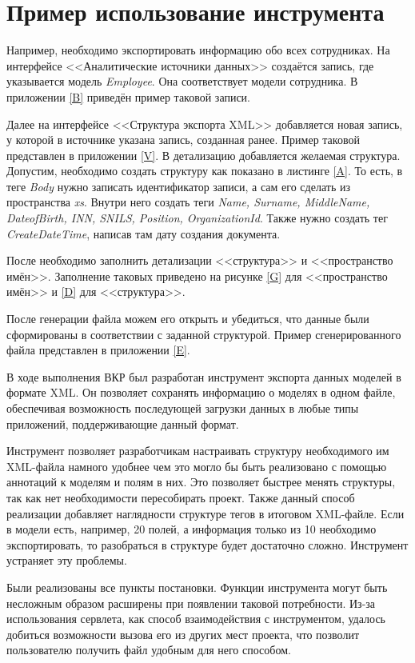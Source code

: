 \documentclass[a4paper,12pt]{diplom}
\begin{document}
\section{Пример использование инструмента}

Например, необходимо экспортировать информацию обо всех сотрудниках. На интерфейсе <<Аналитические источники данных>> создаётся запись, где указывается модель \textit{Employee}. Она соответствует модели сотрудника. В приложении \ref{B} приведён пример таковой записи.

Далее на интерфейсе <<Структура экспорта XML>> добавляется новая запись, у которой в источнике указана запись, созданная ранее. Пример таковой представлен в приложении \ref{V}. В детализацию добавляется желаемая структура. Допустим, необходимо создать структуру как показано в листинге \ref{A}. То есть, в теге \textit{Body} нужно записать идентификатор записи, а сам его сделать из пространства \textit{xs}. Внутри него создать теги \textit{Name, Surname, MiddleName, DateofBirth, INN, SNILS, Position, OrganizationId}. Также нужно создать тег \textit{CreateDateTime}, написав там дату создания документа.

После необходимо заполнить детализации <<структура>> и <<пространство имён>>. Заполнение таковых приведено на рисунке \ref{G} для <<пространство имён>> и \ref{D} для <<структура>>.

После генерации файла можем его открыть и убедиться, что данные были сформированы в соответствии с заданной структурой. Пример сгенерированного файла представлен в приложении \ref{E}.


В ходе выполнения ВКР был разработан инструмент экспорта данных моделей в формате XML. Он позволяет сохранять информацию о моделях в одном файле, обеспечивая возможность последующей загрузки данных в любые типы приложений, поддерживающие данный формат.

Инструмент позволяет разработчикам настраивать структуру необходимого им XML-файла намного удобнее чем это могло бы быть реализовано с помощью аннотаций к моделям и полям в них. Это позволяет быстрее менять структуры, так как нет необходимости пересобирать проект. Также данный способ реализации добавляет наглядности структуре тегов в итоговом XML-файле. Если в модели есть, например, 20 полей, а информация только из 10 необходимо экспортировать, то разобраться в структуре будет достаточно сложно. Инструмент устраняет эту проблемы.

Были реализованы все пункты постановки. Функции инструмента могут быть несложным образом расширены при появлении таковой потребности. Из-за использования сервлета, как способ взаимодействия с инструментом, удалось добиться возможности вызова его из других мест проекта, что позволит пользователю получить файл удобным для него способом.
\end{document}
